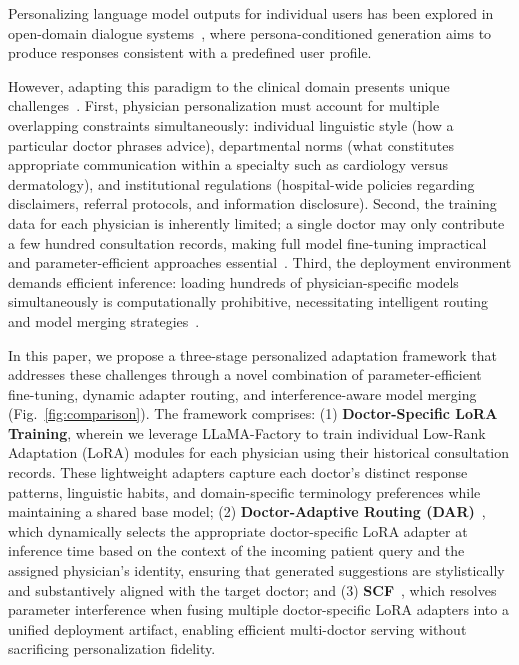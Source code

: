 Personalizing language model outputs for individual users has been explored in open-domain dialogue systems~\cite{zhang2018personalizing,Johnson2021Precision}, where persona-conditioned generation aims to produce responses consistent with a predefined user profile.

However, adapting this paradigm to the clinical domain presents unique challenges~\cite{zhang2018personalizing}. First, physician personalization must account for multiple overlapping constraints simultaneously: individual linguistic style (how a particular doctor phrases advice), departmental norms (what constitutes appropriate communication within a specialty such as cardiology versus dermatology), and institutional regulations (hospital-wide policies regarding disclaimers, referral protocols, and information disclosure). Second, the training data for each physician is inherently limited; a single doctor may only contribute a few hundred consultation records, making full model fine-tuning impractical and parameter-efficient approaches essential~\cite{hu2021lora,peft}. Third, the deployment environment demands efficient inference: loading hundreds of physician-specific models simultaneously is computationally prohibitive, necessitating intelligent routing and model merging strategies~\cite{yadavTIESMergingResolvingInterference2023a,huangLoraHubEfficientCrossTask2024,ilharco2023editing}.

In this paper, we propose a three-stage personalized adaptation framework that addresses these challenges through a novel combination of parameter-efficient fine-tuning, dynamic adapter routing, and interference-aware model merging (Fig.~\ref{fig:comparison}). The framework comprises: (1) \textbf{Doctor-Specific LoRA Training}, wherein we leverage LLaMA-Factory to train individual Low-Rank Adaptation (LoRA) modules for each physician using their historical consultation records. These lightweight adapters capture each doctor's distinct response patterns, linguistic habits, and domain-specific terminology preferences while maintaining a shared base model; (2) \textbf{Doctor-Adaptive Routing (DAR)}~\cite{huangLoraHubEfficientCrossTask2024}, which dynamically selects the appropriate doctor-specific LoRA adapter at inference time based on the context of the incoming patient query and the assigned physician's identity, ensuring that generated suggestions are stylistically and substantively aligned with the target doctor; and (3) \textbf{SCF}~\cite{yadavTIESMergingResolvingInterference2023a}, which resolves parameter interference when fusing multiple doctor-specific LoRA adapters into a unified deployment artifact, enabling efficient multi-doctor serving without sacrificing personalization fidelity.


